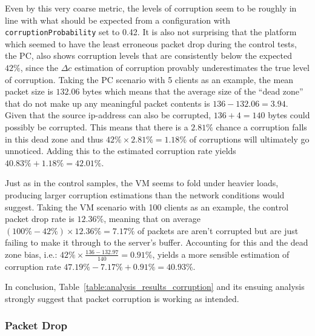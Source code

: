 Even by this very coarse metric, the levels of corruption seem to be roughly in line with what should be expected
from a configuration with \texttt{corruptionProbability} set to 0.42. It is also not surprising that the platform
which seemed to have the least erroneous packet drop during the control tests, the PC, also shows corruption levels
that are consistently below the expected $42\%$, since the $\Delta c$ estimation of corruption provably underestimates
the true level of corruption. Taking the PC scenario with 5 clients as an example, the mean packet size is $132.06$
bytes which means that the average size of the ``dead zone'' that do not make up any meaningful packet contents is
$136 - 132.06 = 3.94$. Given that the source ip-address can also be corrupted, $136 + 4 = 140$ bytes could possibly be
corrupted. This means that there is a $2.81\%$ chance a corruption falls in this dead zone and thus $42\% \times 2
.81\% = 1.18\%$ of corruptions will ultimately go unnoticed. Adding this to the estimated corruption rate yields
$40.83\% + 1.18\% = 42.01\%$.

Just as in the control samples, the VM seems to fold under heavier loads, producing larger corruption estimations
than the network conditions would suggest. Taking the VM scenario with 100 clients as an example, the control packet
drop rate is $12.36\%$, meaning that on average $(100\% - 42\%) \times 12.36\% = 7.17\%$ of packets are aren't
corrupted but are just failing to make it through to the server's buffer. Accounting for this and the dead zone bias,
i.e.: $42\% \times \frac{136 - 132.97}{140} = 0.91\%$, yields a more sensible estimation of corruption rate
$47.19\% - 7.17\% + 0.91\% = 40.93\%$.

In conclusion, Table~\ref{table:analysis_results_corruption} and its ensuing analysis strongly suggest that packet
corruption is working as intended.

\subsubsection{Packet Drop}\label{subsubsection:drop_analysis}

